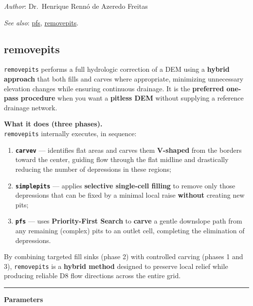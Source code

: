 \documentclass[
]{book}
\providecommand{\tightlist}{%
  \setlength{\itemsep}{0pt}\setlength{\parskip}{0pt}}
\theoremstyle{definition}
\theoremstyle{definition}
\theoremstyle{definition}
\theoremstyle{definition}
\theoremstyle{remark}
\begin{document}
\emph{Author}: Dr.~Henrique Rennó de Azeredo Freitas

\emph{See also}: \hyperref[pfs]{pfs}, \hyperref[removepits]{removepits}.

\subsection{removepits}\label{removepits}

\texttt{removepits} performs a full hydrologic correction of a DEM using a \textbf{hybrid approach} that both fills and carves where appropriate, minimizing unnecessary elevation changes while ensuring continuous drainage. It is the \textbf{preferred one-pass procedure} when you want a \textbf{pitless DEM} without supplying a reference drainage network.

\textbf{What it does (three phases).}\\
\texttt{removepits} internally executes, in sequence:

\begin{enumerate}
\def\labelenumi{\arabic{enumi})}
\tightlist
\item
  \textbf{\texttt{carvev}} --- identifies flat areas and carves them \textbf{V-shaped} from the borders toward the center, guiding flow through the flat midline and drastically reducing the number of depressions in these regions;\\
\item
  \textbf{\texttt{simplepits}} --- applies \textbf{selective single-cell filling} to remove only those depressions that can be fixed by a minimal local raise \textbf{without} creating new pits;\\
\item
  \textbf{\texttt{pfs}} --- uses \textbf{Priority-First Search} to \textbf{carve} a gentle downslope path from any remaining (complex) pits to an outlet cell, completing the elimination of depressions.
\end{enumerate}

By combining targeted fill sinks (phase 2) with controlled carving (phases 1 and 3), \texttt{removepits} is a \textbf{hybrid method} designed to preserve local relief while producing reliable D8 flow directions across the entire grid.

\begin{center}\rule{0.5\linewidth}{0.5pt}\end{center}

\textbf{Parameters}
\end{document}
